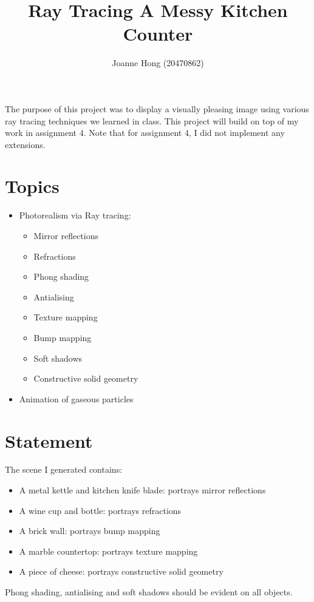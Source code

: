 \documentclass{article}
\title{Ray Tracing A Messy Kitchen Counter}
\author{Joanne Hong (20470862)}
\begin{document}
\maketitle

The purpose of this project was to display a visually pleasing image using various ray tracing techniques we learned in class. This project will build on top of my work in assignment 4. Note that for assignment 4, I did not implement any extensions.

\section{Topics}

\begin{itemize}
  \item Photorealism via Ray tracing:
    \begin{itemize}
      \item Mirror reflections
      \item Refractions
      \item Phong shading
      \item Antialising
      \item Texture mapping
      \item Bump mapping
      \item Soft shadows
      \item Constructive solid geometry
    \end{itemize}
  \item Animation of gaseous particles
\end{itemize}

\section{Statement}

The scene I generated contains:
\begin{itemize}
  \item A metal kettle and kitchen knife blade: portrays mirror reflections
  \item A wine cup and bottle: portrays refractions
  \item A brick wall: portrays bump mapping
  \item A marble countertop: portrays texture mapping
  \item A piece of cheese: portrays constructive solid geometry
\end{itemize}

Phong shading, antialising and soft shadows should be evident on all objects. \\
\end{document}
